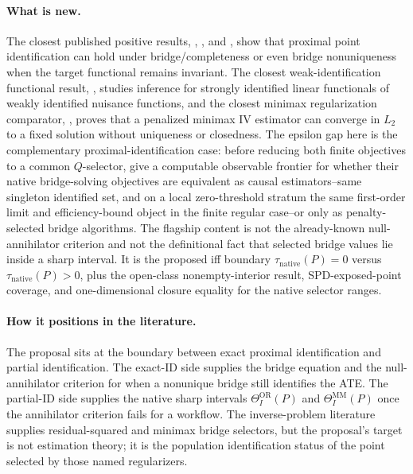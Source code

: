 \documentclass[11pt]{article}
\theoremstyle{definition}
\theoremstyle{plain}
\theoremstyle{remark}
\begin{document}
\paragraph{What is new.}
The closest published positive results, \citet{MiaoGengTchetgen2018Biometrika},
\citet{CuiPuShiMiaoTchetgen2024JASA}, and
\citet{ZhangLiMiaoTchetgen2023SPL}, show that proximal point identification
can hold under bridge/completeness or even bridge nonuniqueness when the
target functional remains invariant.  The closest weak-identification
functional result, \citet{BennettKallusMaoNeweySyrgkanisUehara2023COLT},
studies inference for strongly identified linear functionals of weakly
identified nuisance functions, and the closest minimax regularization
comparator, \citet{BennettKallusMaoNeweySyrgkanisUehara2023MinimaxIV}, proves
that a penalized minimax IV estimator can converge in \(L_2\) to a fixed
solution without uniqueness or closedness.  The epsilon gap here is the
complementary proximal-identification case: before reducing both finite
objectives to a common \(Q\)-selector, give a computable observable frontier
for whether their native bridge-solving objectives are equivalent as causal
estimators--same singleton identified set, and on a local zero-threshold
stratum the same first-order limit and efficiency-bound object in the finite
regular case--or only as
penalty-selected bridge algorithms.  The flagship content is not the
already-known
null-annihilator criterion and not the definitional fact that selected bridge
values lie inside a sharp interval.  It is the proposed iff boundary
\(\tau_{\mathrm{native}}(P)=0\) versus \(\tau_{\mathrm{native}}(P)>0\), plus
the open-class nonempty-interior result, SPD-exposed-point coverage, and
one-dimensional closure equality for the native selector ranges.

\paragraph{How it positions in the literature.}
The proposal sits at the boundary between exact proximal identification and
partial identification.  The exact-ID side supplies the bridge equation and
the null-annihilator criterion for when a nonunique bridge still identifies
the ATE.  The partial-ID side supplies the native sharp intervals
\(\Theta_I^{\mathrm{OR}}(P)\) and \(\Theta_I^{\mathrm{MM}}(P)\) once the
annihilator criterion fails for a workflow.  The inverse-problem literature
supplies residual-squared and minimax bridge selectors, but the proposal's
target is not estimation theory; it is the population identification status
of the point selected by those named regularizers.
\end{document}
